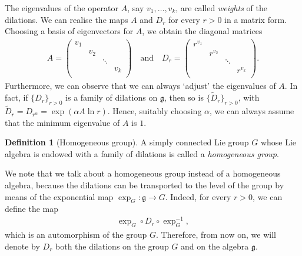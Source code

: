 \documentclass[12pt,oneside,a4paper]{book}
\numberwithin{equation}{section}     %
\theoremstyle{plain}
\theoremstyle{definition}
\newtheorem{definition}[theorem]{Definition}
\begin{document}
The eigenvalues of the operator $A$, say $v_1,\dots,v_k$, are called \textit{weights} of the dilations. We can realise the maps $A$ and $D_r$ for every $r>0$ in a matrix form. Choosing a basis of eigenvectors for $A$, we obtain the diagonal matrices
\begin{align*}
A=\begin{pmatrix}
v_1 & \\
& v_2 \\
&		  & \ddots \\
&		  &        & v_k\\
\end{pmatrix}
\quad\text{and}\quad
D_r=\begin{pmatrix}
r^{v_1} & \\
& r^{v_2} \\
&		  & \ddots \\
&		  &        & r^{v_k}\\
\end{pmatrix}.
\end{align*}
Furthermore, we can observe that we can always `adjust' the eigenvalues of $A$. In fact, if $\{D_r\}_{r>0}$ is a family of dilations on $\mathfrak{g}$, then so is $\{\tilde{D}_{r}\}_{r>0}$, with $\tilde{D}_r=D_{r^\alpha}=\exp(\alpha A\ln r)$. Hence, suitably choosing $\alpha$, we can always assume that the minimum eigenvalue of $A$ is $1$.
\begin{definition}[Homogeneous group]
	A simply connected Lie group $G$ whose Lie algebra is endowed with a family of dilations is called a \textit{homogeneous group}.
\end{definition}
We note that we talk about a homogeneous group instead of a homogeneous algebra, because the dilations can be transported to the level of the group by means of the exponential map $\exp_{G}:\mathfrak{g}\rightarrow G$. Indeed, for every $r>0$, we can define the map
\begin{align}\label{dilationonG}
\exp_{G}\circ D_r\circ \exp_{G}^{-1},
\end{align}
which is an automorphism of the group $G$. Therefore, from now on, we will denote by $D_r$ both the dilations on the group $G$ and on the algebra $\mathfrak{g}$.
\end{document}
